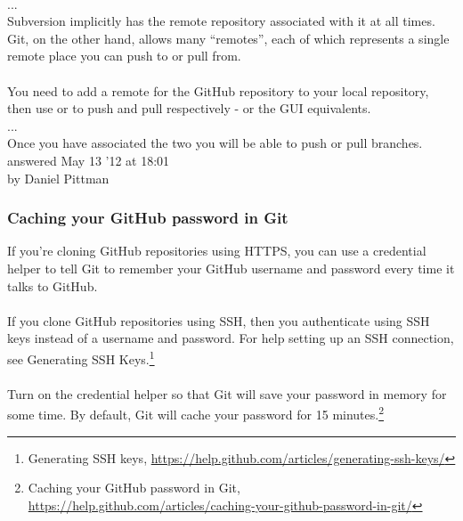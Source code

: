 \begin{center}
{\begin{minipage}[t]{0.9\textwidth}
\\
...
\\
Subversion implicitly has the remote repository associated with
it at all times. Git, on the other hand, allows many ``remotes'',
each of which represents a single remote place you can push to
or pull from.
\\
\\
You need to add a remote for the GitHub repository to your local
repository, then use  or
 to push and pull respectively -
or the GUI equivalents.
\\
...
\\
Once you have associated the two you will be able to push
or pull branches.
\hspace*{20pt}answered May 13 '12 at 18:01\\
\hspace*{20pt}by Daniel Pittman
\end{minipage}
}
\end{center}


\subsubsection{Caching your GitHub password in Git}
If you're cloning GitHub repositories using HTTPS, you can use a
credential helper to tell Git to remember your GitHub username
and password every time it talks to GitHub.
\\
\\
If you clone GitHub repositories using SSH, then you authenticate
using SSH keys instead of a username and password.  For help
setting up an SSH connection, see Generating SSH Keys.\footnote{Generating SSH keys,
\href{https://help.github.com/articles/generating-ssh-keys/}{https://help.github.com/articles/generating-ssh-keys/}}
\\
\\
Turn on the credential helper so that Git will save your password
in memory for some time.  By default, Git will cache your password
for 15 minutes.\footnote{Caching your GitHub password in Git,
\href{https://help.github.com/articles/caching-your-github-password-in-git/}{https://help.github.com/articles/caching-your-github-password-in-git/}}

